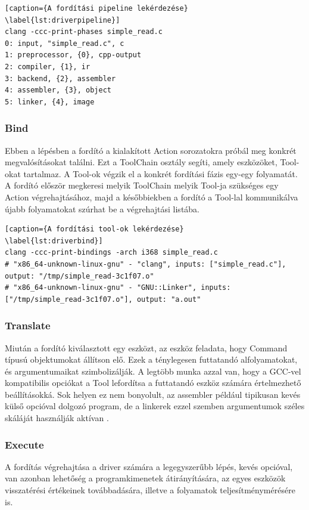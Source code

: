 \documentclass[a4paper,12pt]{report}
\begin{document}
\begin{minipage}{\linewidth}
\begin{lstlisting}[caption={A fordítási pipeline lekérdezése}
\label{lst:driverpipeline}]
clang -ccc-print-phases simple_read.c 
0: input, "simple_read.c", c
1: preprocessor, {0}, cpp-output
2: compiler, {1}, ir
3: backend, {2}, assembler
4: assembler, {3}, object
5: linker, {4}, image
\end{lstlisting}
\end{minipage}

\subsubsection{Bind}
Ebben a lépésben a fordító a kialakított Action sorozatokra próbál meg konkrét megvalósításokat találni. Ezt a ToolChain osztály segíti, amely eszközöket, Tool-okat tartalmaz. A Tool-ok végzik el a konkrét fordítási fázis egy-egy folyamatát. A fordító először megkeresi melyik ToolChain melyik Tool-ja szükséges egy Action végrehajtásához, majd a későbbiekben a fordító a Tool-lal kommunikálva újabb folyamatokat szúrhat be a végrehajtási listába.

\begin{minipage}{\linewidth}
\begin{lstlisting}[caption={A fordítási tool-ok lekérdezése}
\label{lst:driverbind}]
clang -ccc-print-bindings -arch i368 simple_read.c
# "x86_64-unknown-linux-gnu" - "clang", inputs: ["simple_read.c"], output: "/tmp/simple_read-3c1f07.o"
# "x86_64-unknown-linux-gnu" - "GNU::Linker", inputs: ["/tmp/simple_read-3c1f07.o"], output: "a.out"
\end{lstlisting}
\end{minipage}

\subsubsection{Translate}
Miután a fordító kiválasztott egy eszközt, az eszköz feladata, hogy Command típusú objektumokat állítson elő. Ezek a ténylegesen futtatandó alfolyamatokat, és argumentumaikat szimbolizálják. A legtöbb munka azzal van, hogy a GCC-vel kompatibilis opciókat a Tool lefordítsa a futtatandó eszköz számára értelmezhető beállításokká. Sok helyen ez nem bonyolult, az assembler például tipikusan kevés külső opcióval dolgozó program, de a linkerek ezzel szemben argumentumok széles skáláját használják aktívan \cite{clangdriverinternals}.

\subsubsection{Execute}
A fordítás végrehajtása a driver számára a legegyszerűbb lépés, kevés opcióval, van azonban lehetőség a programkimenetek átirányítására, az egyes eszközök visszatérési értékeinek továbbadására, illetve a folyamatok teljesítménymérésére is.
\end{document}
